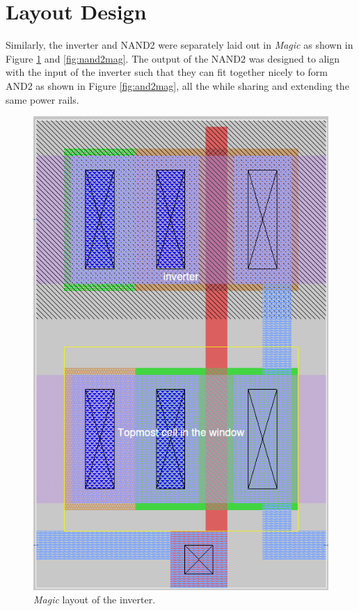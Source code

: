 \documentclass[11pt]{article}
\begin{document}
\FloatBarrier
\section{Layout Design}
    Similarly, the inverter and NAND2 were separately laid out in \textit{Magic} as shown in Figure \ref{fig:invmag} and \ref{fig:nand2mag}. The output of the NAND2 was designed to align with the input of the inverter such that they can fit together nicely to form AND2 as shown in Figure \ref{fig:and2mag}, all the while sharing and extending the same power rails.
    \begin{figure}[!ht]
        \centering
        \includegraphics[width=0.8\linewidth]{inverter_mag.png}
        \caption{\textit{Magic} layout of the inverter.}
        \label{fig:invmag}
    \end{figure}
\end{document}
